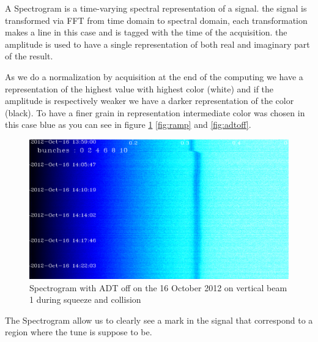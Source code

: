 A Spectrogram is a time-varying spectral representation of a signal. the signal is transformed via \gls{FFT} from time domain to spectral domain, each transformation makes a line in this case and is tagged with the time of the acquisition. the amplitude is used to have a single representation of both real and imaginary part of the result.

As we do a normalization by acquisition at the end of the computing we have a representation of the highest value with highest color (white) and if the amplitude is respectively weaker we have a darker representation of the color (black). To have a finer grain in representation intermediate color was chosen in this case blue as you can see in figure \ref{fig:squeeze} \ref{fig:ramp} and \ref{fig:adtoff}.

\begin{figure}[H]
	\caption{Spectrogram with ADT off on the 16 October 2012 on vertical beam 1 during squeeze and collision}
	\label{fig:squeeze}
	\centering
	\includegraphics[scale=0.3]{md-121016-vb1-m1-6bunches-10acc-1359-1425-collision.pdf}
\end{figure}

The Spectrogram allow us to clearly see a mark in the signal that correspond to a region where the tune is suppose to be.